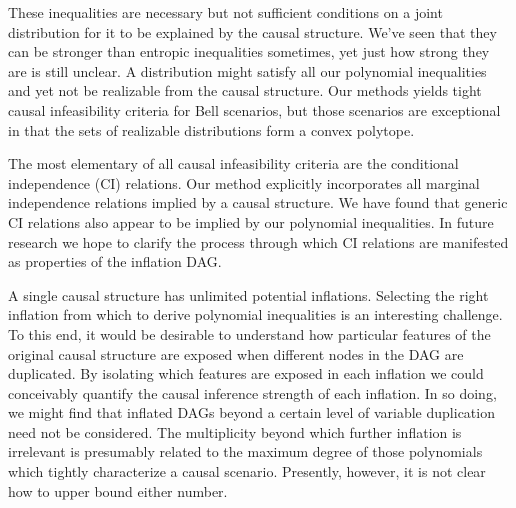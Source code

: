 {These inequalities are necessary but not sufficient conditions on a joint distribution for it to be explained by the causal structure. We've seen that they can be stronger than entropic inequalities sometimes, yet just how strong they are is still unclear. A distribution might satisfy all our polynomial inequalities and yet not be realizable from the causal structure. %
Our methods yields tight causal infeasibility criteria for Bell scenarios, but those scenarios are exceptional in that the sets of realizable distributions form a convex polytope.

The most elementary of all causal infeasibility criteria are the conditional independence (CI) relations. Our method explicitly incorporates all marginal independence relations implied by a causal structure. We have found that generic CI relations also appear to be implied by our polynomial inequalities. In future research we hope to clarify the process through which CI relations are manifested as properties of the inflation DAG.

A single causal structure has unlimited potential inflations. Selecting the right inflation from which to derive polynomial inequalities is an interesting challenge. To this end, it would be desirable to understand how particular features of the original causal structure are exposed when different nodes in the DAG are duplicated. By isolating which features are exposed in each inflation we could conceivably quantify the causal inference strength of each inflation. In so doing, we might find that inflated DAGs beyond a certain level of variable duplication need not be considered. The multiplicity beyond which further inflation is irrelevant is presumably related to the maximum degree of those polynomials which tightly characterize a causal scenario. Presently, however, it is not clear how to upper bound either number.


}
